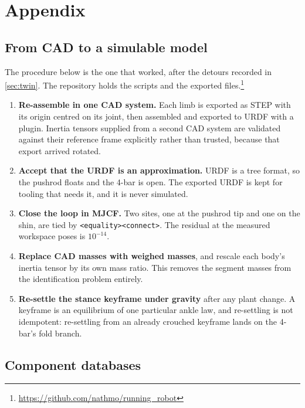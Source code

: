 \newpage
\section{Appendix}
\label{sec:appendix}

\subsection{From CAD to a simulable model}
\label{sec:app-pipeline}

The procedure below is the one that worked, after the detours recorded in \cref{sec:twin}. The
repository holds the scripts and the exported files.\footnote{\url{https://github.com/nathmo/running_robot}}

\begin{enumerate}[leftmargin=*]
  \item \textbf{Re-assemble in one CAD system.} Each limb is exported as STEP with its origin
        centred on its joint, then assembled and exported to URDF with a plugin. Inertia tensors
        supplied from a second CAD system are validated against their reference frame explicitly
        rather than trusted, because that export arrived rotated.
  \item \textbf{Accept that the URDF is an approximation.} URDF is a tree format, so the pushrod
        floats and the 4-bar is open. The exported URDF is kept for tooling that needs it, and it
        is never simulated.
  \item \textbf{Close the loop in MJCF.} Two sites, one at the pushrod tip and one on the shin,
        are tied by \texttt{<equality><connect>}. The residual at the measured workspace poses is
        $10^{-14}$.
  \item \textbf{Replace CAD masses with weighed masses}, and rescale each body's inertia tensor by
        its own mass ratio. This removes the segment masses from the identification problem
        entirely.
  \item \textbf{Re-settle the stance keyframe under gravity} after any plant change. A keyframe is
        an equilibrium of one particular ankle law, and re-settling is not idempotent: re-settling
        from an already crouched keyframe lands on the 4-bar's fold branch.

\end{enumerate}

\subsection{Component databases}
\label{sec:app-db}

